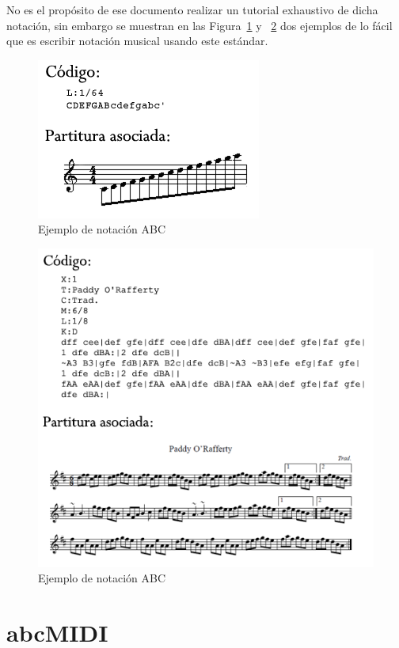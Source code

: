 No es el propósito de ese documento realizar un tutorial exhaustivo de dicha notación, sin embargo se muestran en las Figura~\ref{fig:abcexample} y ~\ref{fig:abcexample2} dos ejemplos de lo fácil que es escribir notación musical usando este estándar.

		\begin{figure}[!htbp]
		\centering
		\includegraphics[scale=0.7]{graphics/abc-example.png}
		\caption{Ejemplo de notación ABC}
		\label{fig:abcexample}
		\end{figure}
		
		\begin{figure}[!htbp]
		\centering
		\includegraphics[scale=0.7]{graphics/abc-example2.png}
		\caption{Ejemplo de notación ABC}
		\label{fig:abcexample2}
		\end{figure}

\section{abcMIDI}
\label{sec:abcMIDI}

